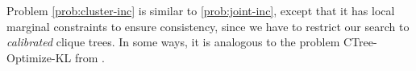 Problem \eqref{prob:cluster-inc} is similar to \eqref{prob:joint-inc}, except
that it
has local marginal constraints to ensure consistency, since we have to restrict our search to \emph{calibrated} clique trees.
In some ways, it is analogous to
the problem 
CTree-Optimize-KL from \textcite[pg. 384]{koller2009probabilistic}.

